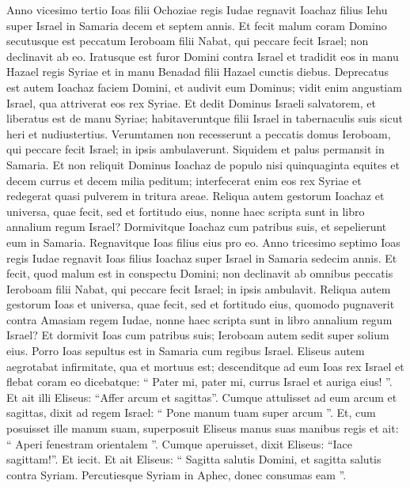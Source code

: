 \begin{biblechapter}
\begin{biblechapter}
\begin{biblechapter}
\begin{biblechapter}
\begin{biblechapter}
\begin{biblechapter}
\begin{biblechapter}
\begin{biblechapter}
\begin{biblechapter}
\begin{biblechapter}
\begin{biblechapter}
\begin{biblechapter}
\begin{biblechapter}
 \verse Anno vicesimo tertio Ioas filii Ochoziae regis Iudae regnavit Ioachaz filius Iehu super Israel in Samaria decem et septem annis. 
\verse Et fecit malum coram Domino secutusque est peccatum Ieroboam filii Nabat, qui peccare fecit Israel; non declinavit ab eo.
 \verse Iratusque est furor Domini contra Israel et tradidit eos in manu Hazael regis Syriae et in manu Benadad filii Hazael cunctis diebus. 
\verse Deprecatus est autem Ioachaz faciem Domini, et audivit eum Dominus; vidit enim angustiam Israel, qua attriverat eos rex Syriae. 
\verse Et dedit Dominus Israeli salvatorem, et liberatus est de manu Syriae; habitaveruntque filii Israel in tabernaculis suis sicut heri et nudiustertius. 
\verse Verumtamen non recesserunt a peccatis domus Ieroboam, qui peccare fecit Israel; in ipsis ambulaverunt. Siquidem et palus permansit in Samaria. 
\verse Et non reliquit Dominus Ioachaz de populo nisi quinquaginta equites et decem currus et decem milia peditum; interfecerat enim eos rex Syriae et redegerat quasi pulverem in tritura areae.
 \verse Reliqua autem gestorum Ioachaz et universa, quae fecit, sed et fortitudo eius, nonne haec scripta sunt in libro annalium regum Israel? 
\verse Dormivitque Ioachaz cum patribus suis, et sepelierunt eum in Samaria. Regnavitque Ioas filius eius pro eo.
 \verse Anno tricesimo septimo Ioas regis Iudae regnavit Ioas filius Ioachaz super Israel in Samaria sedecim annis. 
\verse Et fecit, quod malum est in conspectu Domini; non declinavit ab omnibus peccatis Ieroboam filii Nabat, qui peccare fecit Israel; in ipsis ambulavit. 
\verse Reliqua autem gestorum Ioas et universa, quae fecit, sed et fortitudo eius, quomodo pugnaverit contra Amasiam regem Iudae, nonne haec scripta sunt in libro annalium regum Israel? 
\verse Et dormivit Ioas cum patribus suis; Ieroboam autem sedit super solium eius. Porro Ioas sepultus est in Samaria cum regibus Israel.
 \verse Eliseus autem aegrotabat infirmitate, qua et mortuus est; descenditque ad eum Ioas rex Israel et flebat coram eo dicebatque: “ Pater mi, pater mi, currus Israel et auriga eius! ”. 
\verse Et ait illi Eliseus: “Affer arcum et sagittas”. Cumque attulisset ad eum arcum et sagittas, 
\verse dixit ad regem Israel: “ Pone manum tuam super arcum ”. Et, cum posuisset ille manum suam, superposuit Eliseus manus suas manibus regis 
\verse et ait: “ Aperi fenestram orientalem ”. Cumque aperuisset, dixit Eliseus: “Iace sagittam!”. Et iecit. Et ait Eliseus: “ Sagitta salutis Domini, et sagitta salutis contra Syriam. Percutiesque Syriam in Aphec, donec consumas eam ”. 

\end{biblechapter}
\end{biblechapter}
\end{biblechapter}
\end{biblechapter}
\end{biblechapter}
\end{biblechapter}
\end{biblechapter}
\end{biblechapter}
\end{biblechapter}
\end{biblechapter}
\end{biblechapter}
\end{biblechapter}
\end{biblechapter}
